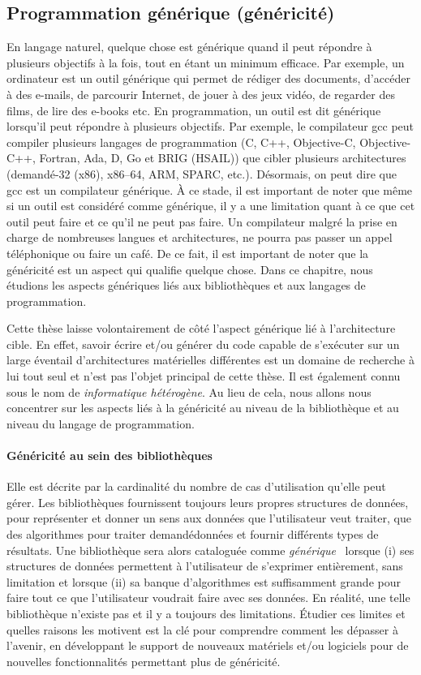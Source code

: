 \subsection*{Programmation générique (généricité)}


En langage naturel, quelque chose est générique quand il peut répondre à plusieurs objectifs à la fois, tout en étant un
minimum efficace. Par exemple, un ordinateur est un outil générique qui permet de rédiger des documents, d'accéder à des
e-mails, de parcourir Internet, de jouer à des jeux vidéo, de regarder des films, de lire des e-books etc. En
programmation, un outil est dit générique lorsqu'il peut répondre à plusieurs objectifs. Par exemple, le compilateur gcc
peut compiler plusieurs langages de programmation (C, C++, Objective-C, Objective-C++, Fortran, Ada, D, Go et BRIG
(HSAIL)) que cibler plusieurs architectures (demandé-32 (x86), x86--64, ARM, SPARC, etc.). Désormais, on peut dire que
gcc est un compilateur générique. À ce stade, il est important de noter que même si un outil est considéré comme
générique, il y a une limitation quant à ce que cet outil peut faire et ce qu'il ne peut pas faire. Un compilateur
malgré la prise en charge de nombreuses langues et architectures, ne pourra pas passer un appel téléphonique ou faire un
café. De ce fait, il est important de noter que la généricité est un aspect qui qualifie quelque chose. Dans ce
chapitre, nous étudions les aspects génériques liés aux bibliothèques et aux langages de programmation.

Cette thèse laisse volontairement de côté l'aspect générique lié à l'architecture cible. En effet, savoir écrire et/ou
générer du code capable de s'exécuter sur un large éventail d'architectures matérielles différentes est un domaine de
recherche à lui tout seul et n'est pas l'objet principal de cette thèse. Il est également connu sous le nom de
\emph{informatique hétérogène}. Au lieu de cela, nous allons nous concentrer sur les aspects liés à la généricité au
niveau de la bibliothèque et au niveau du langage de programmation.

\paragraph{Généricité au sein des bibliothèques} Elle est décrite par la cardinalité du nombre de cas d'utilisation
qu'elle peut gérer. Les bibliothèques fournissent toujours leurs propres structures de données, pour représenter et
donner un sens aux données que l'utilisateur veut traiter, que des algorithmes pour traiter demandédonnées et fournir
différents types de résultats. Une bibliothèque sera alors cataloguée comme
\emph{générique}~\parencite{musser.1994.algorithm} lorsque (i) ses structures de données permettent à l'utilisateur de
s'exprimer entièrement, sans limitation et lorsque (ii) sa banque d'algorithmes est suffisamment grande pour faire tout
ce que l'utilisateur voudrait faire avec ses données. En réalité, une telle bibliothèque n'existe pas et il y a toujours
des limitations. Étudier ces limites et quelles raisons les motivent est la clé pour comprendre comment les dépasser à
l'avenir, en développant le support de nouveaux matériels et/ou logiciels pour de nouvelles fonctionnalités permettant
plus de généricité.

